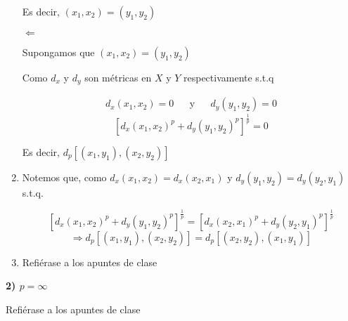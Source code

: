 \begin{proofexplanation}
\begin{enumerate}[label=(\subscript{D}{{\arabic*}})]
        Es decir, $({x}_{1},{x}_{2}) = ({y}_{1},{y}_{2})$ 

        $\Leftarrow$

        Supongamos que $({x}_{1},{x}_{2}) = ({y}_{1},{y}_{2})$

        Como $d_x$ y $d_y$ son métricas en $X$ y $Y$ respectivamente s.t.q 

        \begin{align*}
        {d}_{x}{({x}_{1},{x}_{2})} = 0 & & \text{y} & & {d}_{y}{({y}_{1},{y}_{2})} = 0
        \end{align*}
        \begin{equation*}
            {[{d}_{x}{({x}_{1},{x}_{2})}^{p}+{d}_{y}{({y}_{1},{y}_{2})}^{p}]}^{\frac{1}{p}} = 0
        \end{equation*}

        Es decir, ${d}_{p}[({x}_{1},{y}_{1}), ({x}_{2},{y}_{2})]$

        \item Notemos que, como ${d}_{x}{({x}_{1},{x}_{2})} = {d}_{x}{({x}_{2},{x}_{1})}$  y ${d}_{y}{({y}_{1},{y}_{2})} = {d}_{y}{({y}_{2},{y}_{1})}$ s.t.q.

        \begin{equation*}
            {[{d}_{x}{({x}_{1},{x}_{2})}^{p}+{d}_{y}{({y}_{1},{y}_{2})}^{p}]}^{\frac{1}{p}} = {[{d}_{x}{({x}_{2},{x}_{1})}^{p}+{d}_{y}{({y}_{2},{y}_{1})}^{p}]}^{\frac{1}{p}}
        \end{equation*}
        \begin{equation*}
            \Rightarrow {d}_{p}[({x}_{1},{y}_{1}), ({x}_{2},{y}_{2})] = {d}_{p}[({x}_{2},{y}_{2}), ({x}_{1},{y}_{1})]
        \end{equation*}

        \item Refiérase a los apuntes de clase
    \end{enumerate}
\end{proofexplanation}

\begin{proofexplanation}
    \textcolor{ForestGreen!70!black}{\textbf{2) $p  = \infty$}}

    \smallskip
    
    Refiérase a los apuntes de clase

    \end{proofexplanation}

